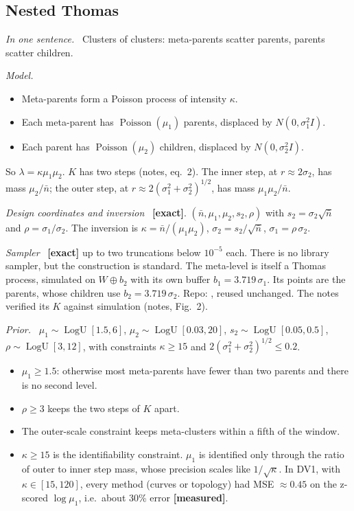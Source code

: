 \documentclass[10pt,a4paper]{article}
\newcommand{\code}[1]{\texttt{\detokenize{#1}}}
\newcommand{\exact}{\textcolor{green!45!black}{\textbf{[exact]}}}
\newcommand{\measured}{\textcolor{green!45!black}{\textbf{[measured]}}}
\newcommand{\nbar}{\bar n}
\newcommand{\LogU}{\operatorname{LogU}}
\newcommand{\Pois}{\operatorname{Poisson}}
\newcommand{\sub}[1]{\par\textit{#1}\ }
\begin{document}
\subsection{Nested Thomas}\label{sec:nested}
\sub{In one sentence.} Clusters of clusters: meta-parents scatter parents, parents scatter children.
\sub{Model.}
\begin{itemize}
  \item Meta-parents form a Poisson process of intensity $\kappa$.
  \item Each meta-parent has $\Pois(\mu_1)$ parents, displaced by $N(0,\sigma_1^2I)$.
  \item Each parent has $\Pois(\mu_2)$ children, displaced by $N(0,\sigma_2^2I)$.
\end{itemize}
So $\lambda=\kappa\mu_1\mu_2$. $K$ has two steps (notes, eq.~2). The inner step, at $r\approx2\sigma_2$, has mass $\mu_2/\nbar$; the outer step, at $r\approx2(\sigma_1^2+\sigma_2^2)^{1/2}$, has mass $\mu_1\mu_2/\nbar$.
\sub{Design coordinates and inversion} \exact. $(\nbar,\mu_1,\mu_2,s_2,\rho)$ with $s_2=\sigma_2\sqrt{\nbar}$ and $\rho=\sigma_1/\sigma_2$. The inversion is $\kappa=\nbar/(\mu_1\mu_2)$, $\sigma_2=s_2/\sqrt{\nbar}$, $\sigma_1=\rho\,\sigma_2$.
\sub{Sampler} \exact{} up to two truncations below $10^{-5}$ each. There is no library sampler, but the construction is standard. The meta-level is itself a Thomas process, simulated on $W\oplus b_2$ with its own buffer $b_1=3.719\,\sigma_1$. Its points are the parents, whose children use $b_2=3.719\,\sigma_2$. Repo: \code{nested_thomas.py}, reused unchanged. The notes verified its $K$ against simulation (notes, Fig.~2).
\sub{Prior.} $\mu_1\sim\LogU[1.5,6]$, $\mu_2\sim\LogU[0.03,20]$, $s_2\sim\LogU[0.05,0.5]$, $\rho\sim\LogU[3,12]$, with constraints $\kappa\ge15$ and $2(\sigma_1^2+\sigma_2^2)^{1/2}\le0.2$.
\begin{itemize}
  \item $\mu_1\ge1.5$: otherwise most meta-parents have fewer than two parents and there is no second level.
  \item $\rho\ge3$ keeps the two steps of $K$ apart.
  \item The outer-scale constraint keeps meta-clusters within a fifth of the window.
  \item $\kappa\ge15$ is the identifiability constraint. $\mu_1$ is identified only through the ratio of outer to inner step mass, whose precision scales like $1/\sqrt{\kappa}$. In DV1, with $\kappa\in[15,120]$, every method (curves or topology) had MSE $\approx0.45$ on the z-scored $\log\mu_1$, i.e.\ about 30\% error \measured.
\end{itemize}
\end{document}
